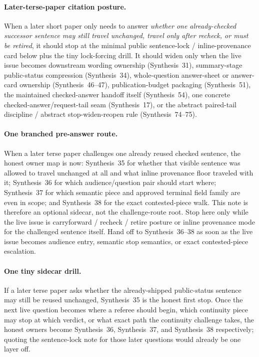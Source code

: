 \documentclass[11pt]{article}
\begin{document}
\paragraph{Later-terse-paper citation posture.}
When a later short paper only needs to answer \emph{whether one already-checked successor sentence may still travel unchanged, travel only after recheck, or must be retired}, it should stop at the minimal public sentence-lock / inline-provenance card below plus the tiny lock-forcing drill. It should widen only when the live issue becomes downstream wording ownership (Synthesis~31), summary-stage public-status compression (Synthesis~34), whole-question answer-sheet or answer-card ownership (Synthesis~46--47), publication-budget packaging (Synthesis~51), the maintained checked-answer handoff itself (Synthesis~54), one concrete checked-answer/request-tail seam (Synthesis~17), or the abstract paired-tail discipline / abstract stop-widen-reopen rule (Synthesis~74--75).\cite{series:downstreamnormalforms,series:statusenvelopes,series:challengeanswersheets,series:challengeanswercards,series:challengeanswerpublicationprofiles,series:challengeanswerreviewmenus,series:workedexample,series:pairedterminalcitationdiscipline,series:pairedterminalcutoverrules}

\paragraph{One branched pre-answer route.}
When a later terse paper challenges one already reused checked sentence, the honest owner map is now: Synthesis~35 for whether that visible sentence was allowed to travel unchanged at all and what inline provenance floor traveled with it; Synthesis~36 for which audience/question pair should start where; Synthesis~37 for which semantic piece and approved terminal field family are even in scope; and Synthesis~38 for the exact contested-piece walk. This note is therefore an optional sidecar, not the challenge-route root. Stop here only while the live issue is carryforward / recheck / retire posture or inline provenance mode for the challenged sentence itself. Hand off to Synthesis~36--38 as soon as the live issue becomes audience entry, semantic stop semantics, or exact contested-piece escalation.\cite{series:challengeroutes,series:challengestops,series:challengebranches}

\paragraph{One tiny sidecar drill.}
If a later terse paper asks whether the already-shipped public-status sentence may still be reused unchanged, Synthesis~35 is the honest first stop. Once the next live question becomes where a referee should begin, which continuity piece may stop at which verdict, or what exact path the continuity challenge takes, the honest owners become Synthesis~36, Synthesis~37, and Synthesis~38 respectively; quoting the sentence-lock note for those later questions would already be one layer off.\cite{series:challengeroutes,series:challengestops,series:challengebranches}
\end{document}
